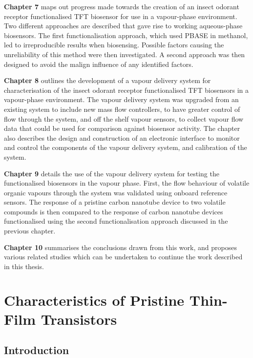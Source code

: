 \documentclass[
  a4paper,
]{scrbook}
\begin{document}
\textbf{Chapter 7} maps out progress made towards the creation of an
insect odorant receptor functionalised TFT biosensor for use in a
vapour-phase environment. Two different approaches are described that
gave rise to working aqueous-phase biosensors. The first
functionalisation approach, which used PBASE in methanol, led to
irreproducible results when biosensing. Possible factors causing the
unreliability of this method were then investigated. A second approach
was then designed to avoid the malign influence of any identified
factors.

\textbf{Chapter 8} outlines the development of a vapour delivery system
for characterisation of the insect odorant receptor functionalised TFT
biosensors in a vapour-phase environment. The vapour delivery system was
upgraded from an existing system to include new mass flow controllers,
to have greater control of flow through the system, and off the shelf
vapour sensors, to collect vapour flow data that could be used for
comparison against biosensor activity. The chapter also describes the
design and construction of an electronic interface to monitor and
control the components of the vapour delivery system, and calibration of
the system.

\textbf{Chapter 9} details the use of the vapour delivery system for
testing the functionalised biosensors in the vapour phase. First, the
flow behaviour of volatile organic vapours through the system was
validated using onboard reference sensors. The response of a pristine
carbon nanotube device to two volatile compounds is then compared to the
response of carbon nanotube devices functionalised using the second
functionalisation approach discussed in the previous chapter.

\textbf{Chapter 10} summarises the conclusions drawn from this work, and
proposes various related studies which can be undertaken to continue the
work described in this thesis.


\hypertarget{sec-pristine-characteristics}{%
\chapter{Characteristics of Pristine Thin-Film
Transistors}\label{sec-pristine-characteristics}}

\hypertarget{introduction-1}{%
\section{Introduction}\label{introduction-1}}
\end{document}
